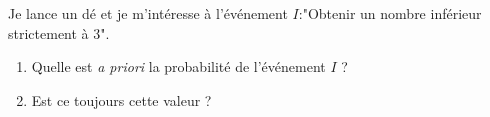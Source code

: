 
Je lance un dé et je m'intéresse à l'événement $I$:"Obtenir un nombre inférieur strictement à 3".
\begin{enumerate}
\item Quelle est \textit{a priori} la probabilité de l'événement $I$ ?
\item Est ce toujours cette valeur ?
\end{enumerate}

